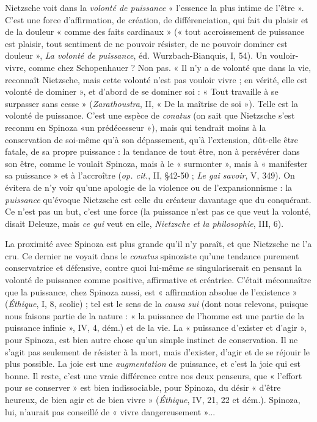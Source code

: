 Nietzsche voit dans la {\it volonté de puissance} « l'essence la plus intime de
l'être ». C’est une force d’affirmation, de création, de différenciation, qui fait
du plaisir et de la douleur « comme des faits cardinaux » (« tout accroissement
de puissance est plaisir, tout sentiment de ne pouvoir résister, de ne pouvoir
dominer est douleur », {\it La volonté de puissance}, éd. Wurzbach-Bianquis, I, 54).
Un vouloir-vivre, comme chez Schopenhauer ? Non pas. « Il n’y a de volonté
que dans la vie, reconnaît Nietzsche, mais cette volonté n’est pas vouloir vivre ;
en vérité, elle est volonté de dominer », et d’abord de se dominer soi : « Tout
travaille à se surpasser sans cesse » ({\it Zarathoustra}, II, « De la maîtrise de soi »).
Telle est la volonté de puissance. C’est une espèce de {\it conatus} (on sait que
Nietzsche s’est reconnu en Spinoza «un prédécesseur »), mais qui tendrait
moins à la conservation de soi-même qu’à son dépassement, qu’à l'extension,
dût-elle être fatale, de sa propre puissance : la tendance de tout être, non à persévérer
dans son être, comme le voulait Spinoza, mais à le « surmonter », mais
à « manifester sa puissance » et à l’accroître ({\it op. cit.}, II, \S 42-50 ; {\it Le gai savoir},
V, 349). On évitera de n’y voir qu’une apologie de la violence ou de
l’expansionnisme : la {\it puissance} qu’évoque Nietzsche est celle du créateur davantage
que du conquérant. Ce n’est pas un but, c’est une force (la puissance n’est
pas ce que veut la volonté, disait Deleuze, mais {\it ce qui} veut en elle, {\it Nietzsche et
la philosophie}, III, 6).

La proximité avec Spinoza est plus grande qu’il n’y paraît, et que Nietzsche
ne l’a cru. Ce dernier ne voyait dans le {\it conatus} spinoziste qu’une tendance
purement conservatrice et défensive, contre quoi lui-même se singulariserait en
pensant la volonté de puissance comme positive, affirmative et créatrice. C’était
méconnaître que la puissance, chez Spinoza aussi, est « affirmation absolue de
l'existence » ({\it Éthique}, I, 8, scolie) ; tel est le sens de la {\it causa sui} (dont nous relevons,
puisque nous faisons partie de la nature : « la puissance de l’homme est
une partie de la puissance infinie », IV, 4, dém.) et de la vie. La « puissance
d’exister et d’agir », pour Spinoza, est bien autre chose qu’un simple instinct de
conservation. Il ne s’agit pas seulement de résister à la mort, mais d’exister,
d’agir et de se réjouir le plus possible. La joie est une {\it augmentation} de puissance,
et c’est la joie qui est bonne. Il reste, c’est une vraie différence entre nos
deux penseurs, que « l’effort pour se conserver » est bien indissociable, pour
Spinoza, du désir « d’être heureux, de bien agir et de bien vivre » ({\it Éthique}, IV,
21, 22 et dém.). Spinoza, lui, n'aurait pas conseillé de « vivre dangereusement »...

